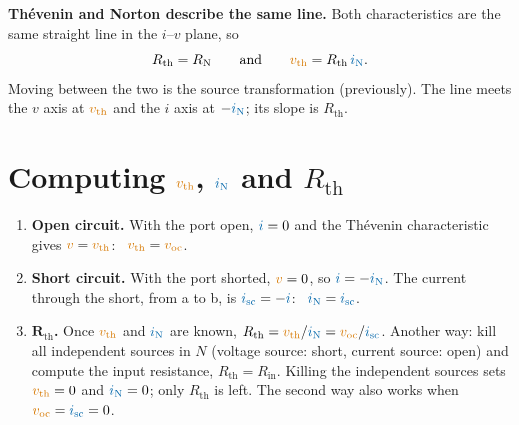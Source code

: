 \documentclass[11pt,a4paper]{article}
\newcommand{\Icol}[1]{\textcolor{ccur}{#1}}
\newcommand{\Vcol}[1]{\textcolor{cvolt}{#1}}
\newcommand{\Rin}{R_{\mathrm{in}}}
\newcommand{\Rth}{R_{\mathrm{th}}}
\newcommand{\RN}{R_{\mathrm{N}}}
\newcommand{\vth}{\Vcol{v_{\mathrm{th}}}}
\newcommand{\iN}{\Icol{i_{\mathrm{N}}}}
\newcommand{\voc}{\Vcol{v_{\mathrm{oc}}}}
\newcommand{\isc}{\Icol{i_{\mathrm{sc}}}}
\newcommand{\Nport}[1]{%
  \ifnum#1=2
    \draw[elem] (0,0) rectangle (1.9,2);
    \node[align=center, font=\scriptsize] at (0.95,1) {$N$\\sources\\killed};
  \else
    \draw[elem] (0,0) rectangle (1.9,2); \node at (0.95,1) {$N$};
  \fi
  \draw (1.9,1.7) -- (3.0,1.7) node[ocirc] {} node[above, tlab] {a};
  \draw (1.9,0.3) -- (3.0,0.3) node[ocirc] {} node[below, tlab] {b};
  \ifcase#1
    \node[pol] at (2.75,1.3) {$+$}; \node[pol] at (2.75,0.62) {$-$};
    \node[font=\small, text=cvolt] at (2.75,0.95) {$v_{\mathrm{oc}}$};
    \node[font=\small, text=ccur, right] at (3.4,1.7) {$i = 0$};
  \or
    \draw (3.0,1.7) -- (3.6,1.7) -- (3.6,0.3) -- (3.0,0.3);
    \draw[iar] (3.85,1.35) -- (3.85,0.65); \node[font=\small, text=ccur, right] at (3.9,1.0) {$i_{\mathrm{sc}}$};
    \node[font=\small, text=cvolt] at (2.6,1.0) {$v = 0$};
  \or
    \draw[bigarr] (4.0,1.0) -- (3.3,1.0); \node[right] at (4.0,1.0) {$\Rin$};
  \fi}
\begin{document}
\begin{minipage}[c]{0.62\linewidth}
\textbf{Th\'evenin and Norton describe the same line.} Both characteristics are the same
straight line in the $i$--$v$ plane, so
\[
  \Rth = \RN \qquad\text{and}\qquad \vth = \Rth\,\iN .
\]
Moving between the two is the source transformation (previously). The line meets the $v$ axis
at $\vth$ and the $i$ axis at $-\iN$; its slope is $\Rth$.
\end{minipage}\hfill
\begin{minipage}[c]{0.34\linewidth}
\centering
{}
\end{minipage}

\section{Computing $\vth$, $\iN$ and $\Rth$}

\begin{center}
\end{center}

\begin{enumerate}\itemsep2pt
  \item \textbf{Open circuit.} With the port open, $\Icol{i} = 0$ and the Th\'evenin
    characteristic gives $\Vcol{v} = \vth$: \ $\vth = \voc$.
  \item \textbf{Short circuit.} With the port shorted, $\Vcol{v} = 0$, so $\Icol{i} = -\iN$.
    The current through the short, from a to b, is $\isc = -\Icol{i}$: \ $\iN = \isc$.
  \item \textbf{$\boldsymbol{\Rth}$.} Once $\vth$ and $\iN$ are known, $\Rth = \vth/\iN =
    \voc/\isc$. Another way: kill all independent sources in $N$ (voltage source: short,
    current source: open) and compute the input resistance, $\Rth = \Rin$. Killing the
    independent sources sets $\vth = 0$ and $\iN = 0$; only $\Rth$ is left. The second way also
    works when $\voc = \isc = 0$.
\end{enumerate}
\end{document}
